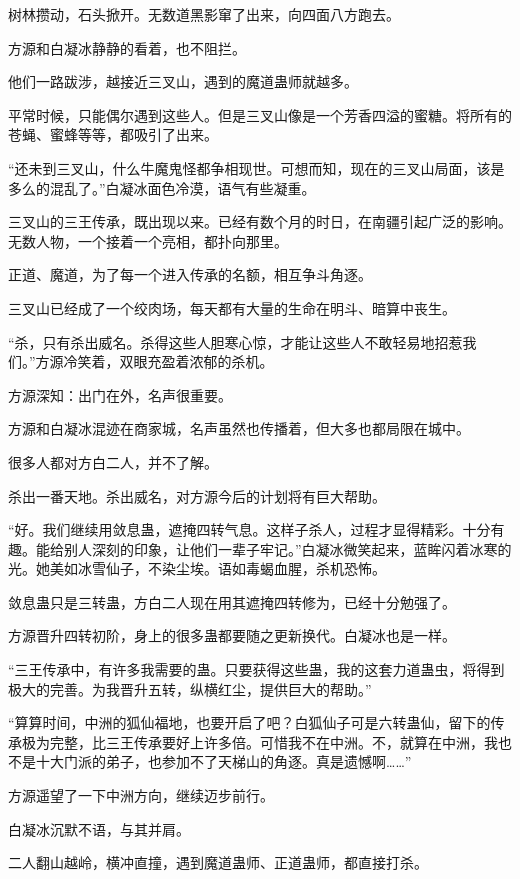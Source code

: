 \begin{this_body}
树林攒动，石头掀开。无数道黑影窜了出来，向四面八方跑去。

方源和白凝冰静静的看着，也不阻拦。

他们一路跋涉，越接近三叉山，遇到的魔道蛊师就越多。

平常时候，只能偶尔遇到这些人。但是三叉山像是一个芳香四溢的蜜糖。将所有的苍蝇、蜜蜂等等，都吸引了出来。

“还未到三叉山，什么牛魔鬼怪都争相现世。可想而知，现在的三叉山局面，该是多么的混乱了。”白凝冰面色冷漠，语气有些凝重。

三叉山的三王传承，既出现以来。已经有数个月的时日，在南疆引起广泛的影响。无数人物，一个接着一个亮相，都扑向那里。

正道、魔道，为了每一个进入传承的名额，相互争斗角逐。

三叉山已经成了一个绞肉场，每天都有大量的生命在明斗、暗算中丧生。

“杀，只有杀出威名。杀得这些人胆寒心惊，才能让这些人不敢轻易地招惹我们。”方源冷笑着，双眼充盈着浓郁的杀机。

方源深知：出门在外，名声很重要。

方源和白凝冰混迹在商家城，名声虽然也传播着，但大多也都局限在城中。

很多人都对方白二人，并不了解。

杀出一番天地。杀出威名，对方源今后的计划将有巨大帮助。

“好。我们继续用敛息蛊，遮掩四转气息。这样子杀人，过程才显得精彩。十分有趣。能给别人深刻的印象，让他们一辈子牢记。”白凝冰微笑起来，蓝眸闪着冰寒的光。她美如冰雪仙子，不染尘埃。语如毒蝎血腥，杀机恐怖。

敛息蛊只是三转蛊，方白二人现在用其遮掩四转修为，已经十分勉强了。

方源晋升四转初阶，身上的很多蛊都要随之更新换代。白凝冰也是一样。

“三王传承中，有许多我需要的蛊。只要获得这些蛊，我的这套力道蛊虫，将得到极大的完善。为我晋升五转，纵横红尘，提供巨大的帮助。”

“算算时间，中洲的狐仙福地，也要开启了吧？白狐仙子可是六转蛊仙，留下的传承极为完整，比三王传承要好上许多倍。可惜我不在中洲。不，就算在中洲，我也不是十大门派的弟子，也参加不了天梯山的角逐。真是遗憾啊……”

方源遥望了一下中洲方向，继续迈步前行。

白凝冰沉默不语，与其并肩。

二人翻山越岭，横冲直撞，遇到魔道蛊师、正道蛊师，都直接打杀。


\end{this_body}
